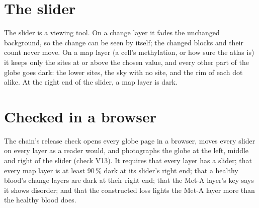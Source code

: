 \section{The slider}

The slider is a viewing tool. On a change layer it fades the unchanged background, so the change can be seen by itself; the changed
blocks and their count never move. On a map layer (a cell's methylation, or how sure the atlas is) it keeps only the sites at or above
the chosen value, and every other part of the globe goes dark: the lower sites, the sky with no site, and the rim of each dot alike.
At the right end of the slider, a map layer is dark.

\section{Checked in a browser}

The chain's release check opens every globe page in a browser, moves every slider on every layer as a reader would, and photographs
the globe at the left, middle and right of the slider (check V13). It requires that every layer has a slider; that every map layer is
at least 90\,\% dark at its slider's right end; that a healthy blood's change layers are dark at their right end; that the Met-A
layer's key says it shows disorder; and that the constructed loss lights the Met-A layer more than the healthy blood does.
